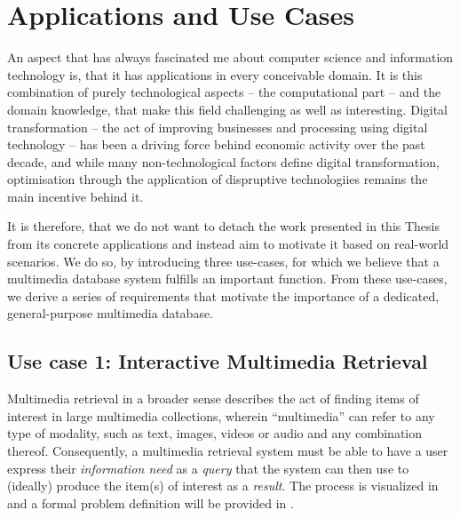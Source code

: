 \chapter{Applications and Use Cases}
\label{chapter:applications}

An aspect that has always fascinated me about computer science and information technology is, that it has applications in every conceivable domain. It is this combination of purely technological aspects -- the computational part -- and the domain knowledge, that make this field challenging as well as interesting. Digital transformation -- the act of improving businesses and processing using digital technology \cite{Vial:2019Understanding} -- has been a driving force behind economic activity over the past decade, and while many non-technological factors define digital transformation, optimisation through the application of dispruptive technologiies remains the main incentive behind it.

It is therefore, that we do not want to detach the work presented in this Thesis from its concrete applications and instead aim to motivate it based on real-world scenarios. We do so, by introducing three use-cases, for which we believe that a multimedia database system fulfills an important function. From these use-cases, we derive a series of requirements that motivate the importance of a dedicated, general-purpose multimedia database.

\section{Use case 1: Interactive Multimedia Retrieval}
\label{section:application_retrieval}

Multimedia retrieval in a broader sense describes the act of finding items of interest in large multimedia collections, wherein ``multimedia'' can refer to any type of modality, such as text, images, videos or audio and any combination thereof. Consequently, a multimedia retrieval system must be able to have a user express their \emph{information need} as a \emph{query} that the system can then use to (ideally) produce the item(s) of interest as a \emph{result}. The process is visualized in  and a formal problem definition will be provided in .

